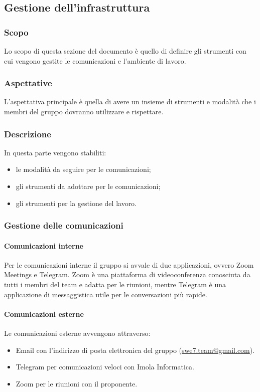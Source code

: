 \subsection{Gestione dell'infrastruttura}
\subsubsection{Scopo}
Lo scopo di questa sezione del documento è quello di definire gli strumenti con cui vengono gestite le comunicazioni e
l'ambiente di lavoro.

\subsubsection{Aspettative}
L'aspettativa principale è quella di avere un insieme di strumenti e modalità che i membri del gruppo dovranno utilizzare e rispettare.

\subsubsection{Descrizione}
In questa parte vengono stabiliti:
\begin{itemize}
    \item le modalità da seguire per le comunicazioni;
    \item gli strumenti da adottare per le comunicazioni;
    \item gli strumenti per la gestione del lavoro.
\end{itemize}

\subsubsection{Gestione delle comunicazioni} 
\paragraph{Comunicazioni interne} \hfill \break
Per le comunicazioni interne il gruppo si avvale di due applicazioni, ovvero Zoom Meetings e Telegram.
Zoom è una piattaforma di videoconferenza conosciuta da tutti i membri del team e adatta per le riunioni, mentre Telegram
è una applicazione di messaggistica utile per le conversazioni più rapide.

\paragraph{Comunicazioni esterne} \hfill \break
Le comunicazioni esterne avvengono attraverso:
\begin{itemize}
    \item Email con l'indirizzo di posta elettronica del gruppo (\href{mailto:swe7.team@gmail.com}{swe7.team@gmail.com}).
    \item Telegram per comunicazioni veloci con Imola Informatica.
    \item Zoom per le riunioni con il proponente.
\end{itemize}

